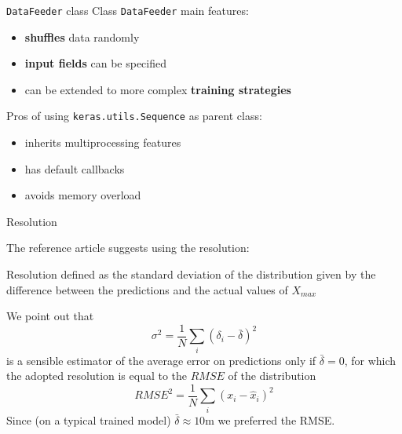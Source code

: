 \documentclass{beamer}
\begin{document}
\begin{frame}{\texttt{DataFeeder} class}
    Class \texttt{DataFeeder} main features:
    \begin{itemize}
        \item[\textbullet] \textbf{shuffles} data randomly
        \item[\textbullet] \textbf{input fields} can be specified
        \item[\textbullet] can be extended to more complex \textbf{training strategies}
    \end{itemize}
    

\vspace{20 pt}
    Pros of using \texttt{keras.utils.Sequence} as parent class:
    \begin{itemize}
        \item[\textbullet] inherits multiprocessing features
        \item[\textbullet] has default callbacks
        \item[\textbullet] avoids memory overload
    \end{itemize}
    
\end{frame}


\begin{frame}{Resolution}

    The reference article suggests using the resolution:
    \begin{block}{Resolution}
        defined as the standard deviation of the distribution given by the difference between the predictions and the actual values of $X_{max}$
    \end{block}

    We point out that 
    \[\sigma^2 = \frac{1}{N}\sum_i (\delta_i - \bar{\delta})^2\]
    is a sensible estimator of the average error on predictions only if $\bar{\delta} = 0$, for which the adopted resolution is equal 
    to the $RMSE$ of the distribution
    \[ RMSE^2 = \frac{1}{N}\sum_i(x_i - \hat{x}_i)^2 \]
    Since (on a typical trained model) $\bar{\delta} \approx 10$m we preferred the RMSE.
\end{frame}
\end{document}
